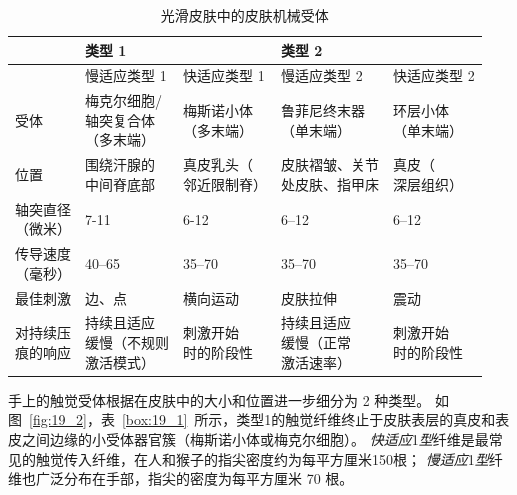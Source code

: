 \begin{table}[htbp]
	\caption{光滑皮肤中的皮肤机械受体} \label{tab:19_1} \centering
	\begin{tabular}{lllll}
		\toprule
		 & 类型 1 &  & 类型 2 & \\
		 \toprule
		 & 慢适应类型 1 & 快适应类型 1  & 慢适应类型 2 & 快适应类型 2 \\
		\midrule
		受体 & \makecell[l]{梅克尔细胞/\\轴突复合体\\（多末端）} & \makecell[l]{梅斯诺小体\\（多末端）} & \makecell[l]{鲁菲尼终末器\\（单末端）} & \makecell[l]{环层小体\\（单末端）} \\
		位置 & \makecell[l]{围绕汗腺的\\中间脊底部} & \makecell[l]{真皮乳头（\\邻近限制脊）} & \makecell[l]{皮肤褶皱、关节\\处皮肤、指甲床} & \makecell[l]{真皮（\\深层组织）} \\
		\makecell[l]{轴突直径\\（微米）} & 7-11 & 6-12 & 6–12 & 6–12 \\
		\makecell[l]{传导速度\\（毫秒）} & 40–65 & 35–70 & 35–70 & 35–70 \\
		最佳刺激 & 边、点 & 横向运动 & 皮肤拉伸 & 震动 \\
		\makecell[l]{对持续压\\痕的响应} & \makecell[l]{持续且适应\\缓慢（不规则\\激活模式）} & \makecell[l]{刺激开始\\时的阶段性} & \makecell{持续且适应\\缓慢（正常\\激活速率）} & \makecell[l]{刺激开始\\时的阶段性} \\
		\bottomrule
	\end{tabular}
\end{table}


手上的触觉受体根据在皮肤中的大小和位置进一步细分为 2 种类型。
如图~\ref{fig:19_2}，表~\ref{box:19_1}~所示，类型1的触觉纤维终止于皮肤表层的真皮和表皮之间边缘的小受体器官簇（梅斯诺小体或梅克尔细胞）。
\textit{快适应}1\textit{型}纤维是最常见的触觉传入纤维，在人和猴子的指尖密度约为每平方厘米150根；
\textit{慢适应}1\textit{型}纤维也广泛分布在手部，指尖的密度为每平方厘米 70 根。


